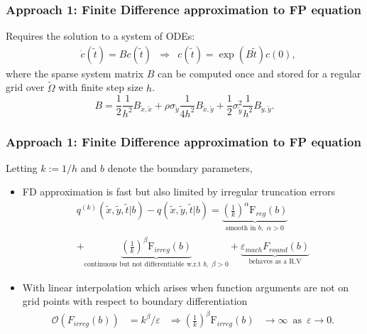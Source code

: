 \documentclass{beamer}
\begin{document}
\begin{frame}
  \frametitle{Approach 1: Finite Difference approximation to FP equation}
  Requires the solution to a system of ODEs:
  \begin{align*}
    & \dot{c}(\tilde{t}) = Bc(\tilde{t}) &\Rightarrow& c(\tilde{t}) = \exp\left(B\tilde{t}\right)c(0), 
  \end{align*}
  where the sparse system matrix $B$ can be computed once and stored for a regular grid over $\tilde{\Omega}$ with finite step size $h$. 
  \[ B = \frac{1}{2} \frac{1}{h^2}B_{\tilde{x},\tilde{x}} +
    \rho\sigma_{\tilde{y}} \frac{1}{4h^2}B_{\tilde{x},\tilde{y}} +
    \frac{1}{2}\sigma_{\tilde{y}}^2
    \frac{1}{h^2}B_{\tilde{y},\tilde{y}}.
\]
\end{frame}
\begin{frame}
  \frametitle{Approach 1: Finite Difference approximation to FP equation}
  Letting $k := 1/h$ and $b$ denote the boundary parameters, 
\begin{itemize}
  \item FD approximation is fast but also limited by irregular truncation errors
  \begin{multline*}
    q^{(k)}(\tilde{x},\tilde{y},\tilde{t} | b) - q(\tilde{x},\tilde{y},\tilde{t} | b) = \underbrace{\left( \frac{1}{k}
    \right)^{\alpha} \mbox{F}_{reg}(b)}_{\mbox{smooth in } b, \,\,\alpha > 0} \\
    + \underbrace{\left( \frac{1}{k}\right)^{\beta}\mbox{F}_{irreg}(b)}_{\mbox{continuous but not differentiable w.r.t }b, \,\, \beta > 0} + \underbrace{\varepsilon_{mach}F_{round}(b)}_{\mbox{behaves as a R.V}}
  \end{multline*}
\item With linear interpolation which arises when function arguments
  are not on grid points with respect to boundary differentiation
  \begin{align*}
    \mathcal{O}(F_{irreg}(b)) &= k^\beta/\varepsilon &\Rightarrow \left( \frac{1}{k}\right)^{\beta}\mbox{F}_{irreg}(b) &\to \infty \,\,\, \mbox{as} \,\,\, \varepsilon \to 0.
  \end{align*}
\end{itemize}
\end{frame}
\end{document}
